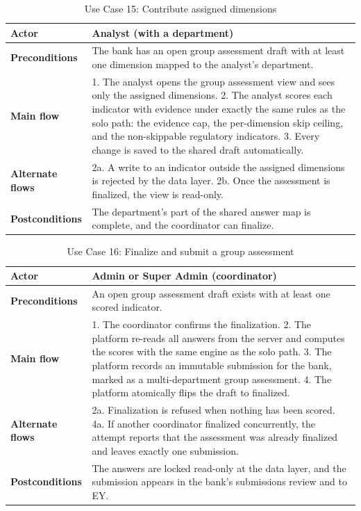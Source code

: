 \begin{table}[H]
\centering
\caption{Use Case 15: Contribute assigned dimensions} \label{tab:uc15}
\begin{tabular}{|p{3cm}|p{12cm}|}
\hline
\textbf{Actor} & Analyst (with a department) \\
\hline
\textbf{Preconditions} & The bank has an open group assessment draft with at least one dimension mapped to the analyst's department. \\
\hline
\textbf{Main flow} & 1. The analyst opens the group assessment view and sees only the assigned dimensions. 2. The analyst scores each indicator with evidence under exactly the same rules as the solo path: the evidence cap, the per-dimension skip ceiling, and the non-skippable regulatory indicators. 3. Every change is saved to the shared draft automatically. \\
\hline
\textbf{Alternate flows} & 2a. A write to an indicator outside the assigned dimensions is rejected by the data layer. 2b. Once the assessment is finalized, the view is read-only. \\
\hline
\textbf{Postconditions} & The department's part of the shared answer map is complete, and the coordinator can finalize. \\
\hline
\end{tabular}

\end{table}

\begin{table}[H]
\centering
\caption{Use Case 16: Finalize and submit a group assessment} \label{tab:uc16}
\begin{tabular}{|p{3cm}|p{12cm}|}
\hline
\textbf{Actor} & Admin or Super Admin (coordinator) \\
\hline
\textbf{Preconditions} & An open group assessment draft exists with at least one scored indicator. \\
\hline
\textbf{Main flow} & 1. The coordinator confirms the finalization. 2. The platform re-reads all answers from the server and computes the scores with the same engine as the solo path. 3. The platform records an immutable submission for the bank, marked as a multi-department group assessment. 4. The platform atomically flips the draft to finalized. \\
\hline
\textbf{Alternate flows} & 2a. Finalization is refused when nothing has been scored. 4a. If another coordinator finalized concurrently, the attempt reports that the assessment was already finalized and leaves exactly one submission. \\
\hline
\textbf{Postconditions} & The answers are locked read-only at the data layer, and the submission appears in the bank's submissions review and to EY. \\
\hline
\end{tabular}

\end{table}

